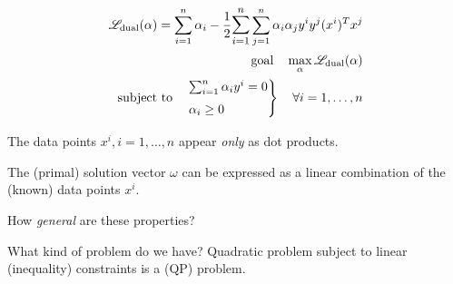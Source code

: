 
\begin{align*}
  \mathscr{L}_\text{dual}(\alpha) = \sum_{i=1}^n \alpha_i - \frac{1}{2} \mathlarger{\sum_{i=1}^n} \sum_{j=1}^n \alpha_i \alpha_j y^i y^j (x^i)^T x^j \\
	\text{goal} \quad \max_{\alpha} \mathscr{L}_\text{dual}(\alpha)                                                                       \\
	\text{subject to} \quad
	\begin{rcases*}
		\sum_{i=1}^n \alpha_i y^i = 0 \\
		\alpha_i \geq 0
	\end{rcases*} \quad \forall i=1,\dots,n
\end{align*}

\begin{note}{}{}
	The data points $x^i, i=1,\dots,n$  appear \emph{only} as
	dot products.
\end{note}

\begin{note}{}{}
	The (primal) solution vector $\omega$
	can be expressed as a linear combination of the (known) data points $x^i$.
\end{note}


\begin{question}{}{}
	How \emph{general} are these properties?
\end{question}

\begin{question}{What kind of problem do we have?}{}
	Quadratic problem subject to linear (inequality) constraints is
	a  (QP) problem.
\end{question}

